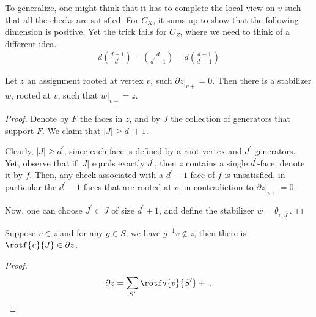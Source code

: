 To generalize, one might think that it has to complete the local view on $v$ such that all the checks are satisfied. For $C_{X}$, it sums up to show that the following dimension is positive. Yet the trick fails for $C_{Z}$, where we need to think of a different idea.
\begin{equation*}
  \begin{split}
    d { d - 1 \choose d^{\prime} } - { d \choose d^{\prime} - 1 } - d { d-1  \choose d^{\prime} - 1 }  
  \end{split}
\end{equation*}


\begin{claim}
  Let $z$ an assignment rooted at vertex $v$, such $\partial z |_{v+} = 0$. Then there is a stabilizer $w$, rooted at $v$, such that $w|_{v+} = z$.  
\end{claim}

\begin{proof}
Denote by $F$ the faces in $z$, and by $J$ the collection of generators that support $F$. We claim that $|J| \ge d^{\prime}+1$.

Clearly, $|J| \ge d^{\prime}$, since each face is defined by a root vertex and $d^{\prime}$ generators. Yet, observe that if $|J|$ equals exactly $d^{\prime}$, then $z$ contains a single $d^{\prime}$-face, denote it by $f$. Then, any check associated with a $d^{\prime}-1$ face of $f$ is unsatisfied, in particular the $d^{\prime}-1$ faces that are rooted at $v$, in contradiction to $\partial z|_{v+} = 0$. 


Now, one can choose $J^{\prime} \subset J$ of size $d^{\prime}+1$, and define the stabilizer $w = \theta_{v,J^{\prime}}$.
    
\end{proof}


\begin{claim} \label{claim:syn_edge}
Suppose $v \in z$ and for any $g \in S$, we have $g^{-1}v \notin z$, then there is $\rotf{v}{J} \in \partial z$.
\end{claim}
\begin{proof}
  
  \begin{equation*}
    \begin{split}
      \partial z = \sum_{S^{\prime}} \rotfv{v}{S^{\prime}} + .. 
    \end{split}
  \end{equation*}
\end{proof}


